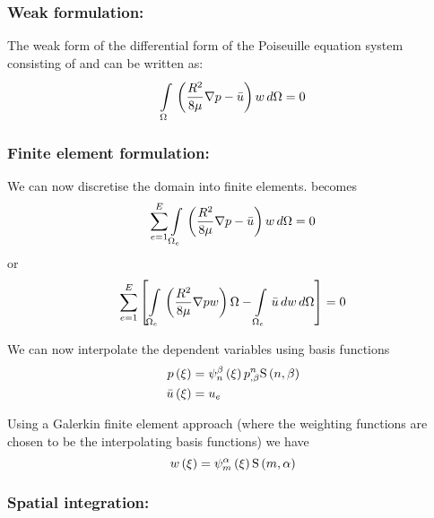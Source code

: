 \subsubsection{Weak formulation:}

The weak form of the differential form of the Poiseuille equation system
consisting of  and can be written as:
\begin{equation}
    \displaystyle\int\limits_{\Omega}^{} \,\left( \dfrac{R^{2}}{8\mu}\nabla p-\bar{u} \right)w\,d\Omega =0
  \label{eqn:Poiseuilleweakform}
\end{equation}

\subsubsection{Finite element formulation:}
We can now discretise the domain into finite elements.  becomes
\begin{equation}
  \displaystyle\sum_{e=1}^{E}  \displaystyle\int\limits_{\Omega_{e}}^{} \,\left( \frac{R^{2}}{8\mu}\nabla p-\bar{u} \right)w\,d\Omega =0
  \label{eqn:Poiseullefemform1}
\end{equation}
or
\begin{equation}
  \displaystyle\sum_{e=1}^{E}\left[   \displaystyle\int\limits_{\Omega_{e}}^{} \,\left( \frac{R^{2}}{8\mu}\nabla pw \right){\Omega}-  \displaystyle\int\limits_{\Omega_{e}}^{} \,\bar{u}\,dw \,d\Omega  \right]=0
  \label{eqn:Poiseullefemform2}
\end{equation}

We can now interpolate the dependent variables using basis functions
\begin{equation}
  \begin{split}
     p\left( \xi \right)  &=    \psi_{n}^{\beta} \left( \xi \right)    {p}^{n} _{,\beta}    \mathrm{S} \left( n,\beta \right)   \\
     \bar{u}\left( \xi \right)  &=  u_{e} 
  \end{split}
\end{equation}

Using a Galerkin finite element approach (where the weighting functions are
chosen to be the interpolating basis functions) we have 
\begin{equation}
   w\left( \xi \right) =   \psi_{m}^{\alpha} \left( \xi \right)     \mathrm{S} \left( m,\alpha \right)  
\end{equation}

\subsubsection{Spatial integration:}

